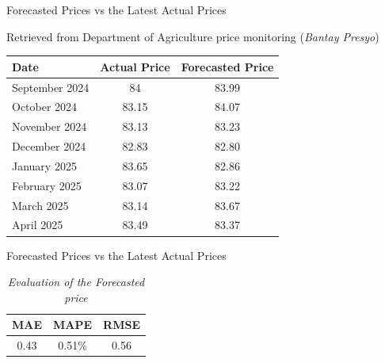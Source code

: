 \documentclass[12pt, aspectratio=169]{beamer}
\begin{document}
\begin{frame}{Forecasted Prices vs the Latest Actual Prices}

     Retrieved from Department of Agriculture price monitoring (\textit{Bantay Presyo})

    \begin{table}[H]
    \label{super}
    \centering
    \begin{tabular}{lcc}
        \toprule
        Date & Actual Price & Forecasted Price  \\
        \midrule
        September 2024 & 84 &    83.99 \\
        October 2024   & 83.15 & 84.07  \\
        November 2024  & 83.13 & 83.23  \\
        December 2024  & 82.83 & 82.80  \\
        January 2025   & 83.65 & 82.86  \\
        February 2025  & 83.07 & 83.22  \\
        March 2025     & 83.14 & 83.67  \\
        April 2025     & 83.49 & 83.37  \\
        \bottomrule
    \end{tabular} 
\end{table}
\end{frame}


\begin{frame}{Forecasted Prices vs the Latest Actual Prices}

\begin{table}[H]
    \caption{\textit{Evaluation of the Forecasted price}}
    \label{eval}
    \centering
    \begin{tabular}{ccc}
        \toprule
         MAE & MAPE & RMSE \\
        \midrule
        0.43 & 0.51\% & 0.56 \\
        \bottomrule
    \end{tabular}
\end{table}
\end{frame}
\end{document}
